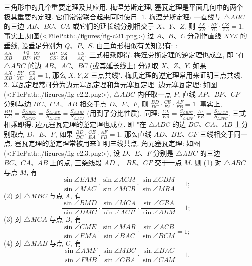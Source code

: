 
三角形中的几个重要定理及其应用.
梅涅劳斯定理, 塞瓦定理是平面几何中的两个极其重要的定理.
它们常常联合起来同时使用.
1. 梅涅劳斯定理: 一直线与 $\triangle A B C$ 的三边 $A B 、 B C 、 C A$ 或它们的延长线分别相交于 $X 、 Y 、 Z$, 则 $\frac{A X}{X B} \cdot \frac{B Y}{Y C} \cdot \frac{C Z}{Z A}=1$.
事实上,如图(<FilePath:./figures/fig-c2i1.png>) 过 $A 、 B 、 C$ 分别作直线 $X Y Z$ 的垂线, 设垂足分别为 $Q 、 P 、 S$. 由三角形相似有关知识有: : $\frac{A X}{X B}=\frac{A Q}{B P}, \frac{B Y}{Y C}=\frac{B P}{C S}, \frac{C Z}{Z A}=\frac{C S}{A Q}$. 三式相乘即得.
梅涅劳斯定理的逆定理也成立, 即 "在 $\triangle A B C$ 的边 $A B 、 A C 、 B C$ (或其延长线上) 分别取 $X 、 Z 、 Y$. 如果 $\frac{A X}{X B} \cdot \frac{B Y}{Y C} \cdot \frac{C Z}{Z A}=1$, 那么 $X, Y, Z$ 三点共线". 梅氏定理的逆定理常用来证明三点共线.
2. 塞瓦定理常可分为边元塞瓦定理和角元塞瓦定理.
边元塞瓦定理: 如图(<FilePath:./figures/fig-c2i2.png>), $\triangle A B C$ 内任取一点 $P$, 直线 $A P 、 B P 、 C P$ 分别与边 $B C 、 C A 、 A B$ 相交于点 $D 、 E 、 F$, 则 $\frac{B D}{D C} \cdot \frac{C E}{E A} \cdot \frac{A F}{F B}=1$.
事实上, $\frac{B D}{D C}=\frac{S_{\triangle B P D}}{S_{\triangle C P D}}=\frac{S_{\triangle A B D}}{S_{\triangle A C D}}=\frac{S_{\triangle A B P}}{S_{\triangle A C P}}$ (用到了分比性质).
同理: $\frac{C E}{E A}=\frac{S_{\triangle B P C}}{S_{\triangle A B P}}, \frac{A F}{F B}=\frac{S_{\triangle A C P}}{S_{\triangle B P C}}$. 三式相乘即得.
边元塞瓦定理的逆定理也成立.
即 "在 $\triangle A B C$ 的边 $B C 、 C A 、 A B$ 上分别取点 $D 、 E 、 F$, 如果 $\frac{B D}{D C} \cdot \frac{C E}{E A} \cdot \frac{A F}{F B}=1$. 那么直线 $A D 、 B E 、 C F$ 三线相交于同一点.
塞瓦定理的逆定理常被用来证明三线共点.
角元塞瓦定理: 如图(<FilePath:./figures/fig-c2i3.png>), 设 $D 、 E 、 F$ 分别是 $\triangle A B C$ 的三边 $B C 、 C A 、 A B$ 上的点, 三条线段 $A D$ 、 $B E 、 C F$ 交于一点 $M$. 则
(1) 对 $\triangle A B C$ 与点 $M$, 有
$$
\frac{\sin \angle B A M}{\sin \angle M A C} \cdot \frac{\sin \angle A C M}{\sin \angle M C B} \cdot \frac{\sin \angle C B M}{\sin \angle M B A}=1 ;
$$
(2) 对 $\triangle M B C$ 与点 $A$, 有
$$
\frac{\sin \angle B M D}{\sin \angle D M C} \cdot \frac{\sin \angle M C A}{\sin \angle A C B} \cdot \frac{\sin \angle C B A}{\sin \angle A B M}=1 ;
$$
(3) 对 $\triangle M C A$ 与点 $B$, 有
$$
\frac{\sin \angle C M E}{\sin \angle E M A} \cdot \frac{\sin \angle M A B}{\sin \angle B A C} \cdot \frac{\sin \angle A C B}{\sin \angle B C M}=1 ;
$$
(4) 对 $\triangle M A B$ 与点 $C$, 有
$$
\frac{\sin \angle A M F}{\sin \angle F M B} \cdot \frac{\sin \angle M B C}{\sin \angle C B A} \cdot \frac{\sin \angle B A C}{\sin \angle C A M}=1 .
$$
